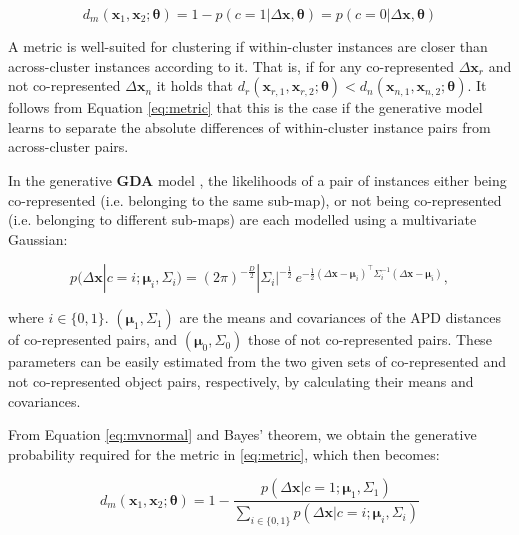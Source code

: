\begin{equation}
\label{eq:metric}
d_m(\bm x_1, \bm x_2; \bm{\theta}) = 1 - p(c=1|\Delta \bm x, \bm{\theta}) = p(c=0|\Delta \bm x, \bm{\theta})
\end{equation}

A metric is well-suited for clustering if within-cluster instances are closer than across-cluster instances according to it. That is, if for any co-represented $\Delta \bm x_r$ and not co-represented $\Delta \bm x_n $ it holds that $ d_r(\bm x_{r,1}, \bm x_{r,2}; \bm{\theta}) < d_n(\bm x_{n,1}, \bm x_{n,2}; \bm{\theta}) $. It follows from Equation \ref{eq:metric} that this is the case if the generative model learns to separate the absolute differences of within-cluster instance pairs from across-cluster pairs.

In the generative \textbf{GDA} model \citep{bensmail1996regularized}, the likelihoods of a pair of instances either being co-represented (i.e. belonging to the same sub-map), or not being co-represented (i.e. belonging to different sub-maps) are each modelled using a multivariate Gaussian: 

\begin{equation}
\label{eq:mvnormal}
p( \Delta \bm x | c=i; \bm \mu_i, \Sigma_i) = (2\pi)^{-\frac{D}{2}}|\Sigma_i|^{-\frac{1}{2}}\, e^{ -\frac{1}{2}(\Delta \mathbf{x}-\bm\mu_i)^\intercal\Sigma_i^{-1}(\Delta \mathbf{x}-\bm\mu_i) },
\end{equation}

\noindent where $i \in \{0,1\}$. $(\bm \mu_1, \Sigma_1)$ are the means and covariances of the APD distances of co-represented pairs, and $(\bm \mu_0, \Sigma_0)$ those of not co-represented pairs. These parameters can be easily estimated from the two given sets of co-represented and not co-represented object pairs, respectively, by calculating their means and covariances. 

From Equation \ref{eq:mvnormal} and Bayes' theorem, we obtain the generative probability required for the metric in \ref{eq:metric}, which then becomes:

\begin{equation}
\label{eq:adsgda}
d_m(\bm x_1, \bm x_2; \bm{\theta}) = 1 - \frac{p( \Delta \bm x | c=1; \bm \mu_1, \Sigma_1)}{\sum_{i \in \{0,1\}} {p( \Delta \bm x | c=i; \bm \mu_i, \Sigma_i)}}
\end{equation}


